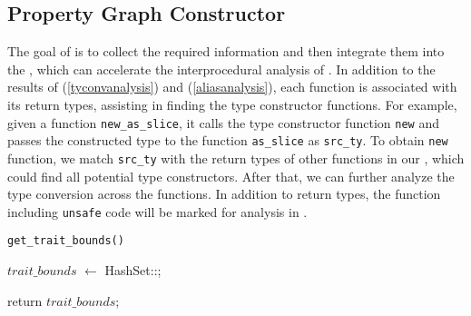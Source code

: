 \subsection{Property Graph Constructor}\label{compone}
{
The goal of \tyanalyzer is to collect the required information and then integrate them into the \pcg, which can accelerate the interprocedural analysis of \bugdetector.
%
In addition to the results of \analysisone (\autoref{tyconvanalysis}) and \analysistwo (\autoref{aliasanalysis}),
each function is associated with its return types, assisting in finding the type constructor functions.
%
For example, 
given a function \texttt{new\_as\_slice},
it calls the type constructor function \texttt{new} and passes the constructed type to the function \texttt{as\_slice} as \texttt{src\_ty}.
To obtain \texttt{new} function, we match \texttt{src\_ty} with the return types of other functions in our \pcg, which could find all potential type constructors.
%
After that, we can further analyze the type conversion across the functions.
%
In addition to return types, the function including \texttt{unsafe} code will be marked for analysis in \bugdetector.
}




\begin{algorithm}[t]
\caption{\texttt{get\_trait\_bounds()}}\label{genanalysis}
\footnotesize
{}

\SetAlgoLined


$trait\_bounds$ $\leftarrow$ HashSet::\new{};


return $trait\_bounds$;
\end{algorithm}






